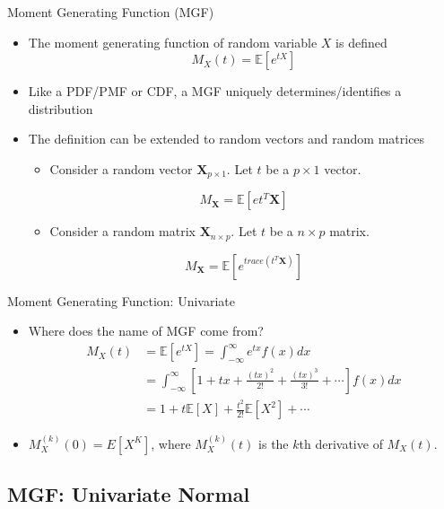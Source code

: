\documentclass[
  ignorenonframetext,
]{beamer}
\providecommand{\tightlist}{%
  \setlength{\itemsep}{0pt}\setlength{\parskip}{0pt}}
\begin{document}
\begin{frame}{Moment Generating Function (MGF)}
\protect\hypertarget{moment-generating-function-mgf}{}
\begin{itemize}
\item
  The moment generating function of random variable \(X\) is defined
  \[M_X(t)=\mathbb{E}[e^{tX}]\]
\item
  Like a PDF/PMF or CDF, a MGF uniquely determines/identifies a
  distribution
\item
  The definition can be extended to random vectors and random matrices

  \begin{itemize}
  \tightlist
  \item
    Consider a random vector \(\mathbf X_{p\times 1}\). Let \(t\) be a
    \(p\times 1\) vector.
  \end{itemize}

  \[M_{\mathbf X}= \mathbb E [e{t^T\mathbf X}]\]

  \begin{itemize}
  \tightlist
  \item
    Consider a random matrix \(\mathbf X_{n\times p}\). Let \(t\) be a
    \(n\times p\) matrix.
  \end{itemize}

  \[M_{\mathbf X}= \mathbb E [e^{trace(t^T\mathbf X)}]\]
\end{itemize}
\end{frame}

\begin{frame}{Moment Generating Function: Univariate}
\protect\hypertarget{moment-generating-function-univariate}{}
\begin{itemize}
\item
  Where does the name of MGF come from? \[
  \begin{aligned}
  M_X(t) &= \mathbb{E}[e^{tX}] = \int_{-\infty}^{\infty} e^{tx} f(x) dx\\
  &=\int_{-\infty}^{\infty} [1 + tx + \frac{(tx)^2}{2!} + \frac{(tx)^3}{3!} + \cdots] f(x) dx\\
  &= 1+ t\mathbb{E}[X] + \frac{t^2}{2!}\mathbb{E}[X^2] + \cdots
  \end{aligned}
  \]
\item
  \(M^{(k)}_X(0)=E[X^K]\), where \(M^{(k)}_X(t)\) is the \(k\)th
  derivative of \(M_X(t)\).
\end{itemize}
\end{frame}

\hypertarget{mgf-univariate-normal}{%
\subsection{MGF: Univariate Normal}\label{mgf-univariate-normal}}
\end{document}
